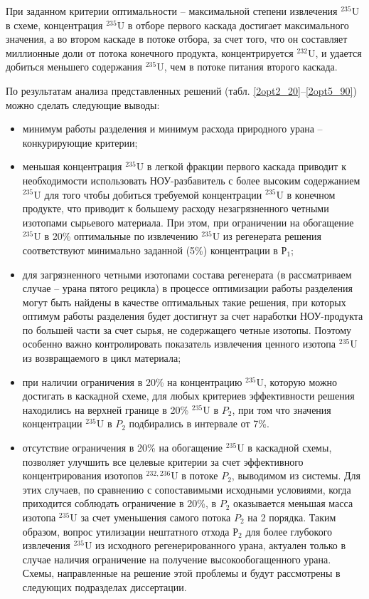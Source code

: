 При заданном критерии оптимальности -- максимальной степени извлечения $^{235}$U в схеме, концентрация $^{235}$U в отборе первого каскада достигает максимального значения, а во втором каскаде в потоке отбора, за счет того, что он составляет миллионные доли от потока конечного продукта, концентрируется $^{232}$U, и удается добиться меньшего содержания $^{235}$U, чем в потоке питания второго каскада.


По результатам анализа представленных решений (табл. \ref{2opt2_20}--\ref{2opt5_90}) можно сделать следующие выводы:
\begin{itemize}
    \item минимум работы разделения и минимум расхода природного урана -- конкурирующие критерии;
    \item меньшая концентрация $^{235}$U в легкой фракции первого каскада приводит к необходимости использовать НОУ-разбавитель с более высоким содержанием $^{235}$U для того чтобы добиться требуемой концентрации $^{235}$U в конечном продукте, что приводит к большему расходу незагрязненного четными изотопами сырьевого материала. При этом, при ограничении на обогащение $^{235}$U в 20\% оптимальные по извлечению $^{235}$U из регенерата решения соответствуют минимально заданной (5\%) концентрации в $Р_1$;
    \item для загрязненного четными изотопами состава регенерата (в рассматриваем случае -- урана пятого рецикла) в процессе оптимизации работы разделения могут быть найдены в качестве оптимальных такие решения, при которых оптимум работы разделения будет достигнут за счет наработки НОУ-продукта по большей части за счет сырья, не содержащего четные изотопы. Поэтому особенно важно контролировать показатель извлечения ценного изотопа $^{235}$U из возвращаемого в цикл материала;
    \item при наличии ограничения в 20\% на концентрацию $^{235}$U, которую можно достигать в каскадной схеме, для любых критериев эффективности решения находились на верхней границе в 20\% $^{235}$U в $P_2$, при том что значения концентрации $^{235}$U в $P_2$ подбирались в интервале от 7\%.
    \item отсутствие ограничения в 20\% на обогащение $^{235}$U в каскадной схемы, позволяет улучшить все целевые критерии за счет эффективного концентрирования изотопов $^{232,236}$U в потоке $P_2$, выводимом из системы. Для этих случаев, по сравнению с сопоставимыми исходными условиями, когда приходится соблюдать ограничение в 20\%, в $P_2$ оказывается меньшая масса изотопа $^{235}$U за счет уменьшения самого потока $P_2$ на 2 порядка. Таким образом, вопрос утилизации нештатного отхода $Р_2$ для более глубокого извлечения $^{235}$U из исходного регенерированного урана, актуален только в случае наличия ограничение на получение высокообогащенного урана. Схемы, направленные на решение этой проблемы и будут рассмотрены в следующих подразделах диссертации.
\end{itemize}

